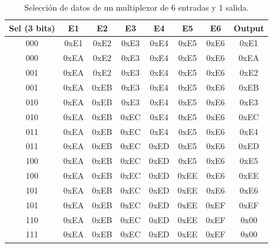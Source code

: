 \documentclass[9pt,technote]{IEEEtran}
\begin{document}
    \begin{table}[htb]
    	\centering
    	\begin{tabular}{|c|c|c|c|c|c|c|c|} 
    		\hline
    		\textbf{Sel (3 bits)} & \textbf{E1} & \textbf{E2} & \textbf{E3} & \textbf{E4} & \textbf{E5} & \textbf{E6} & \textbf{Output} \\ 
    		\hline\hline{\centering}
    		000 & 0xE1 & 0xE2 & 0xE3 & 0xE4 & 0xE5 & 0xE6 & 0xE1 \\ 
    		\hline{\centering}
    		000 & 0xEA & 0xE2 & 0xE3 & 0xE4 & 0xE5 & 0xE6 & 0xEA \\ 
    		\hline{\centering}
    		001 & 0xEA & 0xE2 & 0xE3 & 0xE4 & 0xE5 & 0xE6 & 0xE2 \\  
    		\hline{\centering}
    		001 & 0xEA & 0xEB & 0xE3 & 0xE4 & 0xE5 & 0xE6 & 0xEB \\ 
    		\hline{\centering}
    		010 & 0xEA & 0xEB & 0xE3 & 0xE4 & 0xE5 & 0xE6 & 0xE3 \\
    		\hline{\centering}
    		010 & 0xEA & 0xEB & 0xEC & 0xE4 & 0xE5 & 0xE6 & 0xEC \\
    		\hline{\centering}
    		011 & 0xEA & 0xEB & 0xEC & 0xE4 & 0xE5 & 0xE6 & 0xE4 \\ 
    		\hline{\centering}
    		011 & 0xEA & 0xEB & 0xEC & 0xED & 0xE5 & 0xE6 & 0xED \\
    		\hline{\centering}
    		100 & 0xEA & 0xEB & 0xEC & 0xED & 0xE5 & 0xE6 & 0xE5 \\
    		\hline{\centering}
    		100 & 0xEA & 0xEB & 0xEC & 0xED & 0xEE & 0xE6 & 0xEE \\
    		\hline{\centering}
    		101 & 0xEA & 0xEB & 0xEC & 0xED & 0xEE & 0xE6 & 0xE6 \\
    		\hline{\centering}
    		101 & 0xEA & 0xEB & 0xEC & 0xED & 0xEE & 0xEF & 0xEF \\
    		\hline{\centering}
    		110 & 0xEA & 0xEB & 0xEC & 0xED & 0xEE & 0xEF & 0x00 \\
    		\hline{\centering}
    		111 & 0xEA & 0xEB & 0xEC & 0xED & 0xEE & 0xEF & 0x00 \\
    		\hline
    	\end{tabular}
    	\caption{Selección de datos de un multiplexor de 6 entradas y 1 salida.}
    	\label{Tabla:MUX6_SIM_VAL:1}
    \end{table}
\end{document}

